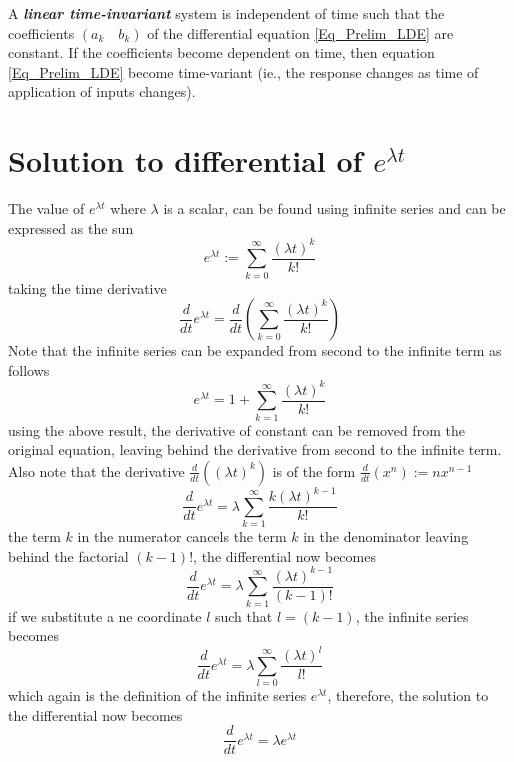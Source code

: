 A \textbf{\textit{linear time-invariant}} system is independent of time such that the coefficients $(a_k \quad b_k)$ of the differential equation \eqref{Eq_Prelim_LDE} are constant. If the coefficients become dependent on time, then equation \eqref{Eq_Prelim_LDE} become time-variant (ie., the response changes as time of application of inputs changes).

\section{Solution to differential of $e^{\lambda t}$}

The value of $e^{\lambda t}$ where $\lambda$ is a scalar, can be found using infinite series and can be expressed as the sun
\begin{equation}
	e^{\lambda t} := \sum_{k = 0}^{\infty} \frac{(\lambda t)^{k}}{k!}
\end{equation}
taking the time derivative
\begin{equation}
	\frac{d}{dt} e^{\lambda t} = \frac{d}{dt} \left( \sum_{k = 0}^{\infty} \frac{(\lambda t)^{k}}{k!} \right)
\end{equation}
Note that the infinite series can be expanded from second to the infinite term as follows
$$ e^{\lambda t} = 1 + \sum_{k = 1}^{\infty}  \frac{(\lambda t)^{k}}{k!} $$
using the above result, the derivative of constant can be removed from the original equation, leaving behind the derivative from second to the infinite term. Also note that the derivative $\frac{d}{dt} ((\lambda t)^{k})$ is of the form $\frac{d}{dt} (x^{n}) := n x^{n -1}$
\begin{equation}
	\frac{d}{dt} e^{\lambda t} = \lambda \sum_{k = 1}^{\infty} \frac{k (\lambda t)^{k - 1}}{k!}
\end{equation}
the term $k$ in the numerator cancels the term $k$ in the denominator leaving behind the factorial $(k-1)!$, the differential now becomes
\begin{equation}
	\frac{d}{dt} e^{\lambda t} = \lambda \sum_{k = 1}^{\infty} \frac{(\lambda t)^{k - 1}}{(k-1)!}
\end{equation}
if we substitute a ne coordinate $l$ such that $l = (k-1)$, the infinite series becomes
\begin{equation}
\frac{d}{dt} e^{\lambda t} = \lambda \sum_{l = 0}^{\infty} \frac{(\lambda t)^{l}}{l!}
\end{equation}
which again is the definition of the infinite series $e^{\lambda t}$, therefore, the solution to the differential now becomes
\begin{equation}
	\frac{d}{dt} e^{\lambda t} = \lambda e^{\lambda t}
\end{equation}


